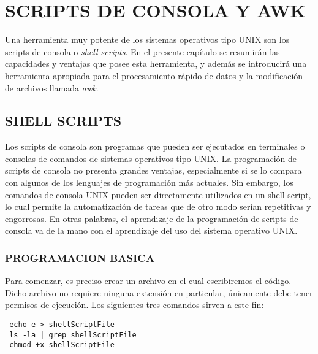 
\chapter{SCRIPTS DE CONSOLA Y AWK} %

\label{AC} %


Una herramienta muy potente de los sistemas operativos tipo UNIX son los scripts de consola o \textit{shell scripts}. En el presente
capítulo se resumirán las capacidades y ventajas que posee esta herramienta, y además se introducirá una herramienta apropiada para
el procesamiento rápido de datos y la modificación de archivos llamada \textit{awk}.

\section{SHELL SCRIPTS}

Los scripts de consola son programas que pueden ser ejecutados en terminales o consolas de comandos de sistemas operativos tipo UNIX. La programación de scripts de consola no presenta grandes ventajas, especialmente si se lo compara con algunos de los lenguajes de programación más actuales. Sin embargo, los comandos de consola UNIX pueden ser directamente utilizados en un shell script, lo cual permite la automatización de tareas que de otro modo serían repetitivas y engorrosas. En otras palabras, el aprendizaje de la programación de scripts de consola va de la mano con el aprendizaje del uso del sistema operativo UNIX. 

\subsection{PROGRAMACION BASICA}

Para comenzar, es preciso crear un archivo en el cual escribiremos el código. Dicho archivo no requiere ninguna extensión en particular,
únicamente debe tener permisos de ejecución. Los siguientes tres comandos sirven a este fin:
\begin{lstlisting}
 echo e > shellScriptFile
 ls -la | grep shellScriptFile
 chmod +x shellScriptFile
\end{lstlisting}

